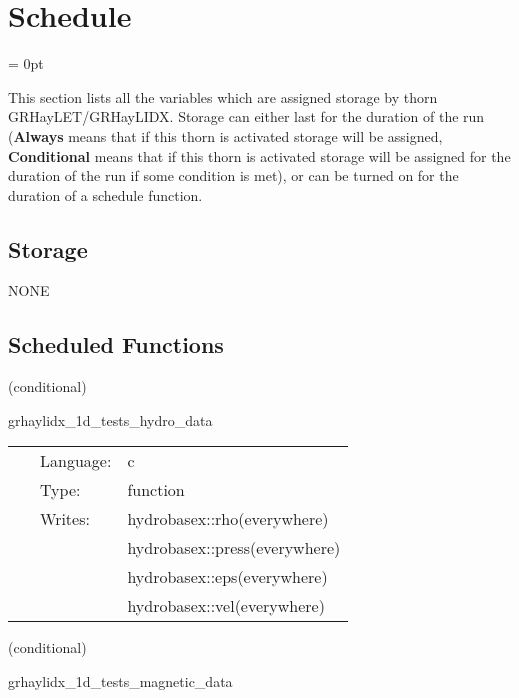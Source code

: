 
\section{Schedule} 


\parskip = 0pt


\noindent This section lists all the variables which are assigned storage by thorn GRHayLET/GRHayLIDX.  Storage can either last for the duration of the run ({\bf Always} means that if this thorn is activated storage will be assigned, {\bf Conditional} means that if this thorn is activated storage will be assigned for the duration of the run if some condition is met), or can be turned on for the duration of a schedule function.


\subsection*{Storage}NONE
\subsection*{Scheduled Functions}
\vspace{5mm}

   (conditional) 

\hspace{5mm} grhaylidx\_1d\_tests\_hydro\_data 

\hspace{5mm}{\it set initial hydrodynamic data for 1d test } 


\hspace{5mm}

 \begin{tabular*}{160mm}{cll} 
~ & Language:  & c \\ 
~ & Type:  & function \\ 
~ & Writes:  & hydrobasex::rho(everywhere) \\ 
~& ~ &hydrobasex::press(everywhere)\\ 
~& ~ &hydrobasex::eps(everywhere)\\ 
~& ~ &hydrobasex::vel(everywhere)\\ 
\end{tabular*} 


\vspace{5mm}

   (conditional) 

\hspace{5mm} grhaylidx\_1d\_tests\_magnetic\_data 

